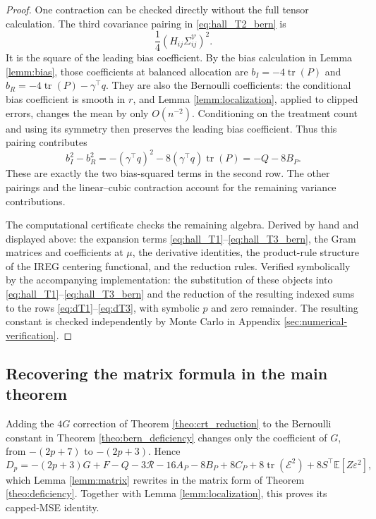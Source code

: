 \documentclass{article}
\newcommand{\EEE}{\mathbb{E}}
\DeclareMathOperator{\tr}{tr}
\theoremstyle{plain}
\theoremstyle{definition}
\theoremstyle{remark}
\begin{document}
\begin{proof}
One contraction can be checked directly without the full tensor
calculation. The third covariance pairing in
\eqref{eq:hall_T2_bern} is
\[
\frac14(H_{ij}\Sigma^{\mathcal V}_{ij})^2.
\]
It is the square of the leading bias coefficient. By the bias
calculation in Lemma \ref{lemm:bias}, those coefficients at balanced
allocation are $b_I=-4\tr(P)$ and
$b_R=-4\tr(P)-\gamma^\top q$. They are also the Bernoulli
coefficients: the conditional bias coefficient is smooth in $r$,
and Lemma \ref{lemm:localization}, applied to clipped errors, changes the mean by only $O(n^{-2})$. Conditioning on the treatment count and using its symmetry then preserves the leading bias coefficient. Thus this pairing contributes
\[
b_I^2-b_R^2
=-(\gamma^\top q)^2
-8(\gamma^\top q)\tr(P)
=-Q-8B_P.
\]
These are exactly the two bias-squared terms in the second row.
The other pairings and the linear--cubic contraction account for the
remaining variance contributions.

The computational certificate checks the remaining algebra. Derived
by hand and displayed above: the expansion terms \eqref{eq:hall_T1}--\eqref{eq:hall_T3_bern}, the Gram matrices and coefficients at $\mu$, the derivative identities, the product-rule structure of the IREG centering functional, and the reduction rules. Verified symbolically by the accompanying implementation: the substitution of these objects into \eqref{eq:hall_T1}--\eqref{eq:hall_T3_bern} and the reduction of the resulting indexed sums to the rows \eqref{eq:dT1}--\eqref{eq:dT3}, with symbolic $p$ and zero remainder. The resulting constant is checked independently by Monte Carlo in Appendix
\ref{sec:numerical-verification}.
\end{proof}

\subsection{Recovering the matrix formula in the main theorem}

Adding the $4G$ correction of Theorem \ref{theo:crt_reduction} to
the Bernoulli constant in Theorem \ref{theo:bern_deficiency} changes
only the coefficient of $G$, from $-(2p+7)$ to $-(2p+3)$. Hence
\begin{equation}
\label{eq:unsimp}
D_p
=
-(2p+3)G
+F-Q-3\mathcal R
-16A_P-8B_P+8C_P
+8\tr(\mathcal E^2)
+8S^\top \EEE[Z\varepsilon^2],
\end{equation}
which Lemma \ref{lemm:matrix} rewrites in the matrix form of
Theorem \ref{theo:deficiency}. Together with Lemma \ref{lemm:localization}, this proves its capped-MSE identity.
\end{document}
